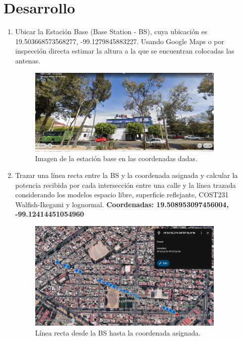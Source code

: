 \section{\Large Desarrollo}

\begin{enumerate}
    \subsection{Obteniendo los datos.}
    \item Ubicar la Estación Base (Base Station - BS), cuya ubicación es 19.503668573568277, -99.1279845883227. Usando Google Maps o por inspección directa estimar la altura a la que se encuentran colocadas las antenas.
          \begin{figure}[H]
              \centering
              \includegraphics[width=0.9\textwidth]{./img/bs.png}
              \caption{Imagen de la estación base en las coordenadas dadas.}
              \label{fig:bs}
          \end{figure}
    \item Trazar una línea recta entre la BS y la coordenada asignada y calcular la potencia recibida por cada intersección entre una calle y la línea trazada considerando los modelos espacio libre, superficie reflejante, COST231 Walfish-Ikegami y lognormal.
          \textbf{Coordenadas: 19.508953097456004, -99.12414451054960}
          \begin{figure}[H]
              \centering
              \includegraphics[width=0.9\textwidth]{./img/coordenada-dada.png}
              \caption{Línea recta desde la BS hasta la coordenada asignada.}
              \label{fig:coordenada-dada}
          \end{figure}


\end{enumerate}
